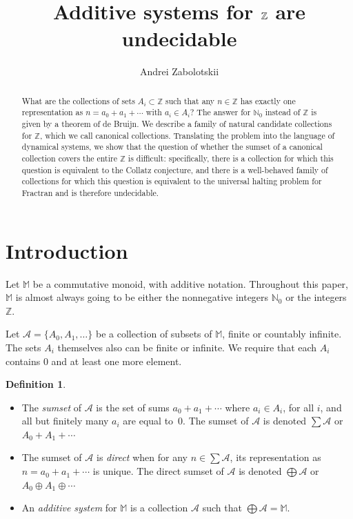 \documentclass[12pt]{article}
\title{Additive systems for $\Z$ are undecidable}
\author{Andrei Zabolotskii}
\date{}
\theoremstyle{definition}
\newtheorem{definition}{Definition}
\newcommand{\N}{\mathbb{N}}
\newcommand{\Z}{\mathbb{Z}}
\begin{document}
\maketitle

\begin{abstract}
What are the collections of sets ${A}_i\subset\Z$ such that any $n\in\Z$ has exactly one representation as $n=a_0+a_1+\dotsb$ with $a_i\in{A}_i$? The answer for $\N_0$ instead of $\Z$ is given by a theorem of de Bruijn. We describe a family of natural candidate collections for $\Z$, which we call canonical collections. Translating the problem into the language of dynamical systems, we show that the question of whether the sumset of a canonical collection covers the entire $\Z$ is difficult: specifically, there is a collection for which this question is equivalent to the Collatz conjecture, and there is a well-behaved family of collections for which this question is equivalent to the universal halting problem for Fractran and is therefore undecidable.
\end{abstract}

\section{Introduction}
Let $\mathbb{M}$ be a commutative monoid, with additive notation. Throughout this paper, $\mathbb{M}$ is almost always going to be either the nonnegative integers $\N_0$ or the integers $\Z$.

Let $\mathcal{A}=\{A_0,{A}_1,\dotsc\}$ be a collection of subsets of $\mathbb{M}$, finite or countably infinite. The sets ${A}_i$ themselves also can be finite or infinite. We require that each ${A}_i$ contains 0 and at least one more element.

\begin{definition}\label{def:basic}~\par
\begin{itemize}
\item The \emph{sumset} of $\mathcal{A}$ is the set of sums $a_0+a_1+\dotsb$ where $a_i\in A_i$, for all $i$, and all but finitely many $a_i$ are equal to~0. The sumset of $\mathcal{A}$ is denoted $\sum\mathcal{A}$ or $A_0+A_1+\dotsb$
\item The sumset of $\mathcal{A}$ is \emph{direct} when for any $n\in\sum\mathcal{A}$, its representation as $n=a_0+a_1+\dotsb$ is unique. The direct sumset of $\mathcal{A}$ is denoted $\bigoplus\mathcal{A}$ or $A_0\oplus A_1\oplus\dotsb$
\item An \emph{additive system} for $\mathbb{M}$ is a collection $\mathcal{A}$ such that $\bigoplus\mathcal{A} = \mathbb{M}$.
\end{itemize}
\end{definition}
\end{document}
